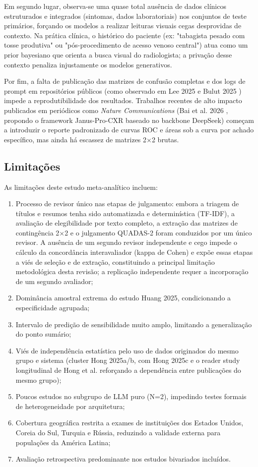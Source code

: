 \documentclass[12pt,a4paper]{article}
\begin{document}
Em segundo lugar, observa-se uma quase total ausência de dados clínicos estruturados e integrados (sintomas, dados laboratoriais) nos conjuntos de teste primários, forçando os modelos a realizar leituras visuais cegas desprovidas de contexto. Na prática clínica, o histórico do paciente (ex: "tabagista pesado com tosse produtiva" ou "pós-procedimento de acesso venoso central") atua como um prior bayesiano que orienta a busca visual do radiologista; a privação desse contexto penaliza injustamente os modelos generativos.

Por fim, a falta de publicação das matrizes de confusão completas e dos logs de prompt em repositórios públicos (como observado em Lee 2025 \cite{lee} e Bulut 2025 \cite{bulut}) impede a reprodutibilidade dos resultados. Trabalhos recentes de alto impacto publicados em periódicos como \textit{Nature Communications} (Bai et al. 2026 \cite{bai}, propondo o framework Janus-Pro-CXR baseado no backbone DeepSeek) começam a introduzir o reporte padronizado de curvas ROC e áreas sob a curva por achado específico, mas ainda há escassez de matrizes 2$\times$2 brutas.

\subsection{Limitações}
As limitações deste estudo meta-analítico incluem:
\begin{enumerate}
    \item Processo de revisor único nas etapas de julgamento: embora a triagem de títulos e resumos tenha sido automatizada e determinística (TF-IDF), a avaliação de elegibilidade por texto completo, a extração das matrizes de contingência 2$\times$2 e o julgamento QUADAS-2 foram conduzidos por um único revisor. A ausência de um segundo revisor independente e cego impede o cálculo da concordância interavaliador (kappa de Cohen) e expõe essas etapas a viés de seleção e de extração, constituindo a principal limitação metodológica desta revisão; a replicação independente requer a incorporação de um segundo avaliador;
    \item Dominância amostral extrema do estudo Huang 2025, condicionando a especificidade agrupada;
    \item Intervalo de predição de sensibilidade muito amplo, limitando a generalização do ponto sumário;
    \item Viés de independência estatística pelo uso de dados originados do mesmo grupo e sistema (cluster Hong 2025a/b, com Hong 2025c e o reader study longitudinal de Hong et al. \cite{hongjacr} reforçando a dependência entre publicações do mesmo grupo);
    \item Poucos estudos no subgrupo de LLM puro (N=2), impedindo testes formais de heterogeneidade por arquitetura;
    \item Cobertura geográfica restrita a exames de instituições dos Estados Unidos, Coreia do Sul, Turquia e Rússia, reduzindo a validade externa para populações da América Latina;
    \item Avaliação retrospectiva predominante nos estudos bivariados incluídos.
\end{enumerate}
\end{document}

